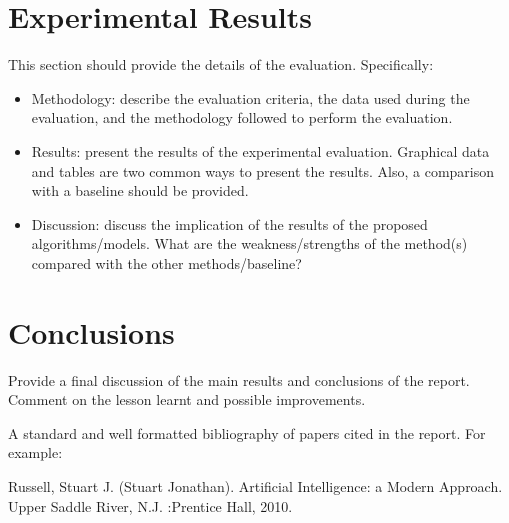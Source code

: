 \documentclass{svproc}
\begin{document}
\section{Experimental Results}
This section should provide the details of the evaluation. Specifically:
\begin{itemize}
\item Methodology: describe the evaluation criteria, the data used during the evaluation, and the methodology followed to perform the evaluation. 
\item Results: present the results of the experimental evaluation. Graphical data and tables are two common ways to present the results. Also, a comparison with a baseline should be provided.
\item Discussion: discuss the implication of the results of the proposed algorithms/models. What are the weakness/strengths of the method(s) compared with the other methods/baseline?
\end{itemize}

\section{Conclusions}
Provide a final discussion of the main results and conclusions of the report. Comment on the lesson learnt and possible improvements.


A standard and well formatted bibliography of papers cited in the report. For example:

\begin{thebibliography}{6}
%

Russell, Stuart J. (Stuart Jonathan). Artificial Intelligence: a Modern Approach. Upper Saddle River, N.J.       :Prentice Hall, 2010.


\end{thebibliography}
\end{document}
